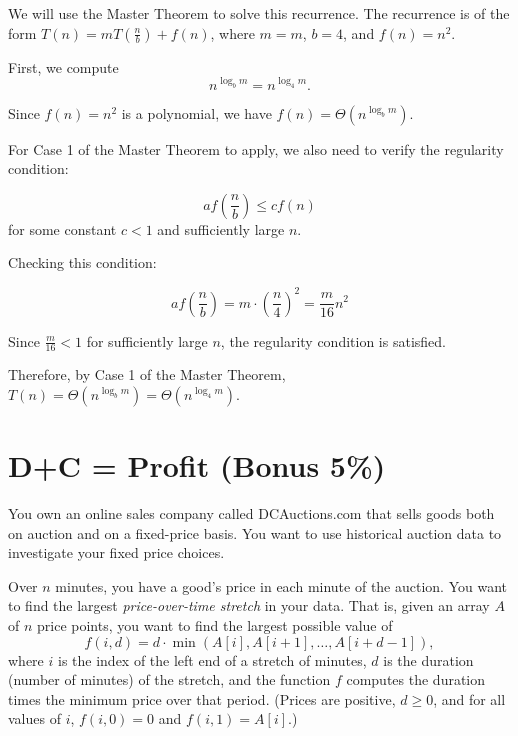 \documentclass[11pt,fleqn]{exam}
\newenvironment{soln}{\color{solnblue}}{}
\newif\ifsolutions\solutionsfalse
\begin{document}
\begin{questions}
    \begin{soln}
        We will use the Master Theorem to solve this recurrence.
        The recurrence is of the form $T(n) = mT\left( \frac{n}{b} \right) + f(n)$, where $m = m$, $b = 4$, and $f(n) = n^2$.

        First, we compute
        \[n^{\log_b m} = n^{\log_4 m}.\]

        Since $f(n) = n^2$ is a polynomial, we have $f(n) = \Theta(n^{\log_b m})$.

        For Case 1 of the Master Theorem to apply, we also need to verify the regularity condition:

        \[af\left(\frac{n}{b}\right) \leq cf(n)\] for some constant $c < 1$ and sufficiently large $n$.

        Checking this condition:

        \[af\left(\frac{n}{b}\right) = m \cdot \left(\frac{n}{4}\right)^2 = \frac{m}{16}n^2\]

        Since $\frac{m}{16} < 1$ for sufficiently large $n$, the regularity condition is satisfied.

        Therefore, by Case 1 of the Master Theorem, $T(n) = \Theta(n^{\log_b m}) = \Theta(n^{\log_4 m})$.
    \end{soln}

    \ifsolutions\fi 

\end{questions}

\section{D+C = Profit (Bonus 5\%)}
You own an online sales company called DCAuctions.com that sells goods both on auction and on a fixed-price basis. You want to use historical auction data to investigate your fixed price choices.
	
	Over $n$ minutes, you have a good's price in each minute of the auction. You want to find the largest \textit{price-over-time stretch} in your data. That is, given an array $A$ of $n$ price points, you want to find the largest possible value of
	$$
	f(i,d) = d \cdot \min(A[i], A[i+1], \ldots, A[i+d-1]),
	$$
	where $i$ is the index of the left end of a stretch of minutes, $d$ is the duration (number of minutes) of the stretch, and the function $f$ computes the duration times the minimum price over that period. (Prices are positive, $d \ge 0$, and for all values of $i$, $f(i,0) = 0$ and $f(i,1) = A[i]$.)
	
\end{document}
